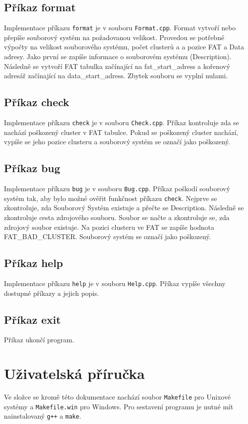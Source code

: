 \documentclass[12pt, a4paper]{article}
\begin{document}
\subsection{Příkaz format}
Implementace příkazu \texttt{format} je v souboru \texttt{Format.cpp}.
Format vytvoří nebo přepíše souborový systém na požadovanou velikost.
Provedou se potřebné výpočty na velikost souborového systému, počet clusterů a a pozice FAT a Data adresy.
Jako první se zapíše informace o souborovém systému (Description).
Následně se vytvoří FAT tabulka začínající na fat\_start\_adress a kořenový adresář začínající na data\_start\_adress.
Zbytek souboru se vyplní nulami. 

\subsection{Příkaz check}
Implementace příkazu \texttt{check} je v souboru \texttt{Check.cpp}.
Příkaz kontroluje zda se nachází poškozený cluster v FAT tabulce.
Pokud se poškozený cluster nachází, vypíše se jeho pozice clusteru a souborový systém se označí jako poškozený.

\subsection{Příkaz bug}
Implementace příkazu \texttt{bug} je v souboru \texttt{Bug.cpp}.
Příkaz poškodí souborový systém tak, aby bylo možné ověřit funkčnost příkazu \texttt{check}.
Nejprve se zkontroluje, zda Souborový Systém existuje a přečte se Description.
Následně se zkontroluje cesta zdrojového souboru.
Soubor se načte a zkontroluje se, zda zdrojový soubor existuje.
Na pozici clusteru ve FAT se zapíše hodnota FAT\_BAD\_CLUSTER.
Souborový systém se označí jako poškozený.

\subsection{Příkaz help}
Implementace příkazu \texttt{help} je v souboru \texttt{Help.cpp}.
Příkaz vypíše všechny dostupné příkazy a jejich popis.

\subsection{Příkaz exit}
Příkaz ukončí program.

\pagebreak

\section{Uživatelská příručka}
Ve složce se kromě této dokumentace nachází soubor \texttt{Makefile} pro Unixové systémy a \texttt{Makefile.win} pro Windows.
Pro sestavení programu je nutné mít nainstalovaný \texttt{g++} a \texttt{make}.
\end{document}
